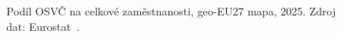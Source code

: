 \def\strEuOsvcMapaTitle{Podíl \acs{OSVČ} na zaměstnanosti (2025)}%
\def\strEuOsvcMapaColorbarLabel{podíl \acs{OSVČ} [\%]}%
\def\strEuOsvcMapaCaption{Podíl \acs{OSVČ} na celkové zaměstnanosti, \acs{geo-EU27} mapa, 2025. Zdroj dat: Eurostat~\cite{eurostat_lfsa_egaps}.}%
%

\providecommand\NudgeEuOsvcMapaCz{5pt}%
\providecommand\NudgeEuOsvcMapaDk{0pt}%
\providecommand\NudgeEuOsvcMapaAt{0pt}%
\providecommand\NudgeEuOsvcMapaDe{0pt}%
\providecommand\NudgeEuOsvcMapaPl{0pt}%
\providecommand\NudgeEuOsvcMapaSk{-5pt}%
\begin{figure}[H]
  \centering
  \resizebox{\linewidth}{!}{}
  \caption{\strEuOsvcMapaCaption}
  \label{fig:eu_osvc_mapa}
\end{figure}
